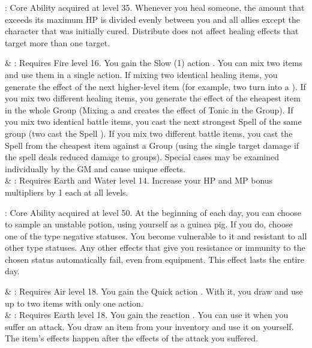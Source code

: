 \begin{ffminipage}
\noindent{}: Core Ability acquired at level 35. Whenever you heal someone, the amount that exceeds its maximum HP is divided evenly between you and all allies except the character that was initially cured. Distribute does not affect healing effects that target more than one target. \pc%

\begin{jobchoice}
 & %
: Requires Fire level 16. You gain the Slow (1) action . You can mix two items and use them in a single action. If mixing two identical healing items, you generate the effect of the next higher-level item (for example, two  turn into a ). If you mix two different healing items, you generate the effect of the cheapest item in the whole Group (Mixing a  and  creates the effect of Tonic in the Group). If you mix two identical battle items, you cast the next strongest Spell of the same group (two  cast the Spell ). If you mix two different battle items, you cast the Spell from the cheapest item against a Group (using the single target damage if the spell deals reduced damage to groups). Special cases may be examined individually by the GM and cause unique effects. \\
  & %
: Requires Earth and Water level 14. Increase your HP and MP bonus multipliers by 1 each at all levels. \\
\end{jobchoice}
\end{ffminipage}

\begin{ffminipage}
\noindent{}: Core Ability acquired at level 50. At the beginning of each day, you can choose to sample an unstable potion, using yourself as a guinea pig. If you do, choose one of the  type negative statuses. You become vulnerable to it and resistant to all other  type statuses. Any other effects that give you resistance or immunity to the chosen status automatically fail, even from equipment. This effect lasts the entire day. \pc%

\begin{jobchoice}
 & %
: Requires Air level 18. You gain the Quick action . With it, you draw and use up to two items with only one action. \\
 & %
: Requires Earth level 18. You gain the reaction . You can use it when you suffer an attack. You draw an item from your inventory and use it on yourself. The item’s effects happen after the effects of the attack you suffered. \\
\end{jobchoice}
\end{ffminipage}